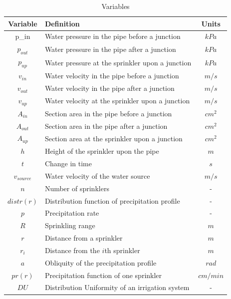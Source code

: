 \documentclass[12pt,a4paper,titlepage]{article}
\begin{document}
\begin{table}[!htb]
\centering \caption{Variables}
\begin{tabular}{lll}
\hline
\multicolumn{1}{c}{Variable} & Definition & \multicolumn{1}{c}{Units} \\
\hline
\multicolumn{1}{c}{p_{in}} & Water pressure in the pipe before a junction & \multicolumn{1}{c}{$kPa$} \\
\multicolumn{1}{c}{$p_{out}$} & Water pressure in the pipe after a junction & \multicolumn{1}{c}{$kPa$} \\
\multicolumn{1}{c}{$p_{up}$} & Water pressure at the sprinkler upon a junction & \multicolumn{1}{c}{$kPa$} \\
\multicolumn{1}{c}{$v_{in}$} & Water velocity in the pipe before a junction & \multicolumn{1}{c}{$m/s$} \\
\multicolumn{1}{c}{$v_{out}$} & Water velocity in the pipe after a junction & \multicolumn{1}{c}{$m/s$} \\
\multicolumn{1}{c}{$v_{up}$} & Water velocity at the sprinkler upon a junction & \multicolumn{1}{c}{$m/s$} \\
\multicolumn{1}{c}{$A_{in}$} & Section area in the pipe before a junction & \multicolumn{1}{c}{$cm^2$} \\
\multicolumn{1}{c}{$A_{out}$} & Section area in the pipe after a junction & \multicolumn{1}{c}{$cm^2$} \\
\multicolumn{1}{c}{$A_{up}$} & Section area at the sprinkler upon a junction & \multicolumn{1}{c}{$cm^2$} \\
\multicolumn{1}{c}{$h$} & Height of the sprinkler upon the pipe & \multicolumn{1}{c}{$m$} \\
\multicolumn{1}{c}{$t$} & Change in time & \multicolumn{1}{c}{$s$} \\
\multicolumn{1}{c}{$v_{source}$} & Water velocity of the water source & \multicolumn{1}{c}{$m/s$} \\
\multicolumn{1}{c}{$n$} & Number of sprinklers & \multicolumn{1}{c}{-} \\
\multicolumn{1}{c}{$distr(r)$} & Distribution function of precipitation profile & \multicolumn{1}{c}{-} \\
\multicolumn{1}{c}{$p$} & Precipitation rate & \multicolumn{1}{c}{-} \\
\multicolumn{1}{c}{$R$} & Sprinkling range & \multicolumn{1}{c}{$m$} \\
\multicolumn{1}{c}{$r$} & Distance from a sprinkler & \multicolumn{1}{c}{$m$} \\
\multicolumn{1}{c}{$r_i$} & Distance from the $i$th sprinkler & \multicolumn{1}{c}{$m$} \\
\multicolumn{1}{c}{$a$} & Obliquity of the precipitation profile & \multicolumn{1}{c}{$rad$} \\
\multicolumn{1}{c}{$pr(r)$} & Precipitation function of one sprinkler & \multicolumn{1}{c}{$cm/min$} \\
\multicolumn{1}{c}{$DU$} & Distribution Uniformity of an irrigation system & \multicolumn{1}{c}{-} \\
\hline
\end{tabular}
\end{table}
\end{document}
